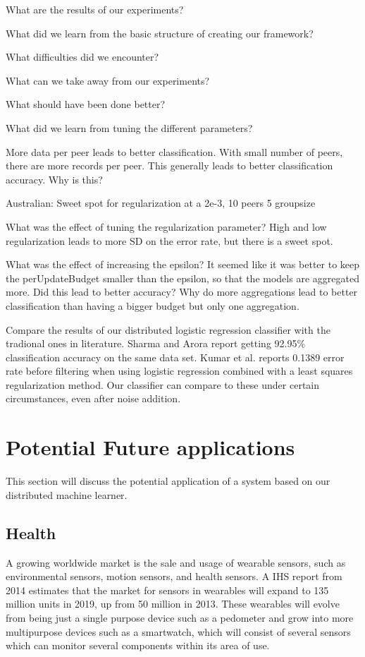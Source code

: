 What are the results of our experiments?

What did we learn from the basic structure of creating our framework?

What difficulties did we encounter?

What can we take away from our experiments?

What should have been done better? 

What did we learn from tuning the different parameters?

More data per peer leads to better classification. With small number of peers, there are more records per peer. This generally leads to better classification accuracy. Why is this? 

Australian: Sweet spot for regularization at a 2e-3, 10 peers 5 groupsize

What was the effect of tuning the regularization parameter? High and low regularization leads to more SD on the error rate, but there is a sweet spot.

What was the effect of increasing the epsilon? 
	It seemed like it was better to keep the perUpdateBudget smaller than the epsilon, so that the models are aggregated more. Did this lead to better accuracy? Why do more aggregations lead to better classification than having a bigger budget but only one aggregation.
	
Compare the results of our distributed logistic regression classifier with the tradional ones in literature. Sharma and Arora \cite{sharma2013adaptive} report getting 92.95\% classification accuracy on the same data set. Kumar et al\cite{kumar2012comparative}. reports  0.1389 error rate before filtering when using logistic regression combined with a least squares regularization method. Our classifier can compare to these under certain circumstances, even after noise addition.  



\section{Potential Future applications}
This section will discuss the potential application of a system based on our distributed machine learner.

\subsection{Health}
A growing worldwide market is the sale and usage of wearable sensors, such as environmental sensors, motion sensors, and health sensors. A IHS report \cite{ihs2014reportwearables} from 2014 estimates that the market for sensors in wearables will expand to 135 million units in 2019, up from 50 million in 2013. These wearables will evolve from being just a single purpose device such as a pedometer and grow into more multipurpose devices such as a smartwatch, which will consist of several sensors which can monitor several components within its area of use. 

